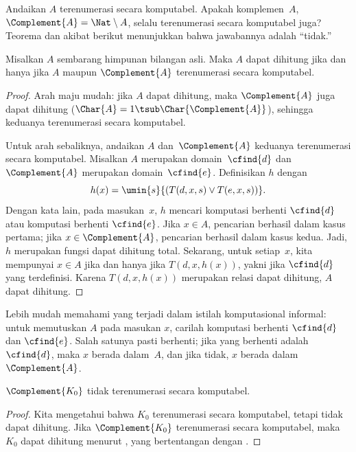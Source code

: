 \documentclass[../../../include/open-logic-section]{subfiles}
\begin{document}

Andaikan $A$ terenumerasi secara komputabel. Apakah komplemen~$A$,
$\Complement{A} = \Nat \setminus A$, selalu terenumerasi secara komputabel
juga? Teorema dan akibat berikut menunjukkan bahwa jawabannya adalah ``tidak.''

\begin{thm}
Misalkan $A$ sembarang himpunan bilangan asli. Maka $A$ dapat dihitung jika dan
hanya jika $A$ maupun $\Complement{A}$ terenumerasi secara komputabel.
\end{thm}

\begin{proof}
Arah maju mudah: jika $A$ dapat dihitung, maka $\Complement{A}$ juga dapat
dihitung ($\Char{A} = 1 \tsub \Char{\Complement{A}}$), sehingga keduanya
terenumerasi secara komputabel.

Untuk arah sebaliknya, andaikan $A$ dan~$\Complement{A}$ keduanya terenumerasi
secara komputabel. Misalkan $A$ merupakan domain~$\cfind{d}$ dan
$\Complement{A}$ merupakan domain~$\cfind{e}$. Definisikan $h$ dengan
\[
h(x) = \umin{s}{(T(d,x,s) \lor T(e,x,s))}.
\]
Dengan kata lain, pada masukan~$x$, $h$ mencari komputasi berhenti
$\cfind{d}$ atau komputasi berhenti $\cfind{e}$. Jika $x \in A$, pencarian
berhasil dalam kasus pertama; jika $x \in \Complement{A}$, pencarian berhasil
dalam kasus kedua. Jadi, $h$ merupakan fungsi dapat dihitung total. Sekarang,
untuk setiap~$x$, kita mempunyai $x \in A$ jika dan hanya jika
$T(d, x, h(x))$, yakni jika $\cfind{d}$ yang terdefinisi. Karena
$T(d, x, h(x))$ merupakan relasi dapat dihitung, $A$ dapat dihitung.
\end{proof}

\begin{explain}
Lebih mudah memahami yang terjadi dalam istilah komputasional informal: untuk
memutuskan $A$ pada masukan $x$, carilah komputasi berhenti $\cfind{d}$ dan
$\cfind{e}$. Salah satunya pasti berhenti; jika yang berhenti adalah
$\cfind{d}$, maka $x$ berada dalam~$A$, dan jika tidak, $x$ berada dalam
$\Complement{A}$.
\end{explain}

\begin{cor}
$\Complement{K_0}$ tidak terenumerasi secara komputabel.
\end{cor}

\begin{proof}
Kita mengetahui bahwa $K_0$ terenumerasi secara komputabel, tetapi tidak dapat
dihitung. Jika $\Complement{K_0}$ terenumerasi secara komputabel, maka $K_0$
dapat dihitung menurut , yang bertentangan dengan
.
\end{proof}
\end{document}

